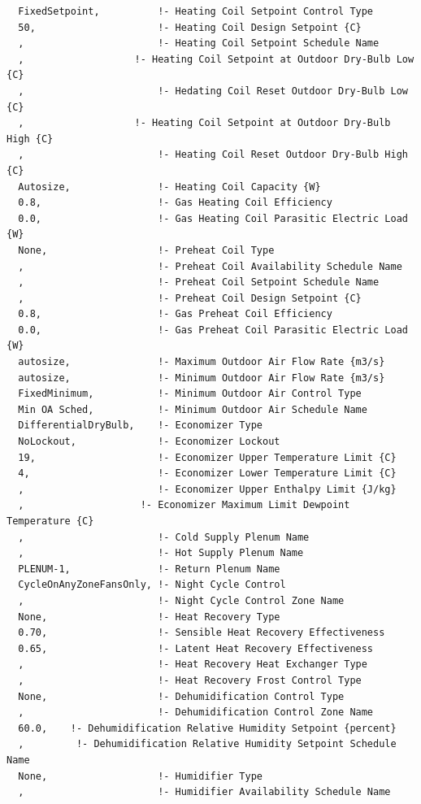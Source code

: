 \begin{lstlisting}
  FixedSetpoint,          !- Heating Coil Setpoint Control Type
  50,                     !- Heating Coil Design Setpoint {C}
  ,                       !- Heating Coil Setpoint Schedule Name
  ,                   !- Heating Coil Setpoint at Outdoor Dry-Bulb Low {C}
  ,                       !- Hedating Coil Reset Outdoor Dry-Bulb Low {C}
  ,                   !- Heating Coil Setpoint at Outdoor Dry-Bulb High {C}
  ,                       !- Heating Coil Reset Outdoor Dry-Bulb High {C}
  Autosize,               !- Heating Coil Capacity {W}
  0.8,                    !- Gas Heating Coil Efficiency
  0.0,                    !- Gas Heating Coil Parasitic Electric Load {W}
  None,                   !- Preheat Coil Type
  ,                       !- Preheat Coil Availability Schedule Name
  ,                       !- Preheat Coil Setpoint Schedule Name
  ,                       !- Preheat Coil Design Setpoint {C}
  0.8,                    !- Gas Preheat Coil Efficiency
  0.0,                    !- Gas Preheat Coil Parasitic Electric Load {W}
  autosize,               !- Maximum Outdoor Air Flow Rate {m3/s}
  autosize,               !- Minimum Outdoor Air Flow Rate {m3/s}
  FixedMinimum,           !- Minimum Outdoor Air Control Type
  Min OA Sched,           !- Minimum Outdoor Air Schedule Name
  DifferentialDryBulb,    !- Economizer Type
  NoLockout,              !- Economizer Lockout
  19,                     !- Economizer Upper Temperature Limit {C}
  4,                      !- Economizer Lower Temperature Limit {C}
  ,                       !- Economizer Upper Enthalpy Limit {J/kg}
  ,                    !- Economizer Maximum Limit Dewpoint Temperature {C}
  ,                       !- Cold Supply Plenum Name
  ,                       !- Hot Supply Plenum Name
  PLENUM-1,               !- Return Plenum Name
  CycleOnAnyZoneFansOnly, !- Night Cycle Control
  ,                       !- Night Cycle Control Zone Name
  None,                   !- Heat Recovery Type
  0.70,                   !- Sensible Heat Recovery Effectiveness
  0.65,                   !- Latent Heat Recovery Effectiveness
  ,                       !- Heat Recovery Heat Exchanger Type
  ,                       !- Heat Recovery Frost Control Type
  None,                   !- Dehumidification Control Type
  ,                       !- Dehumidification Control Zone Name
  60.0,    !- Dehumidification Relative Humidity Setpoint {percent}
  ,         !- Dehumidification Relative Humidity Setpoint Schedule Name
  None,                   !- Humidifier Type
  ,                       !- Humidifier Availability Schedule Name

\end{lstlisting}
